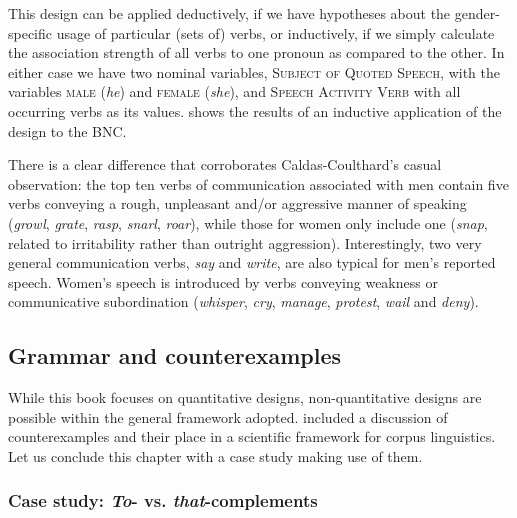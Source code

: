 This design  can be applied deductively,  if we have hypotheses about the gender\hyp{}specific  usage of particular (sets of) verbs,  or inductively,  if we simply calculate the association  strength of all verbs to one pronoun  as compared to the other. In either case we have two nominal  variables, \textsc{Subject of Quoted Speech}, with the variables \textsc{male} (\textit{he}) and \textsc{female} (\textit{she}), and \textsc{Speech Activity Verb} with all occurring verbs  as its values.  shows the results of an inductive  application of the design  to the  BNC.

\hspace*{-0.36885pt}There is a clear difference that corroborates Caldas\hyp{}Coulthard's casual observa\-tion: the top ten verbs  of communication associated  with men contain five verbs conveying a rough, unpleasant and\slash or aggressive manner of speaking (\textit{growl}, \textit{grate}, \textit{rasp}, \textit{snarl}, \textit{roar}), while those for women only include one (\textit{snap}, related to irritability rather than outright aggression).  Interestingly, two very general communication verbs, \textit{say} and \textit{write}, are also typical for men's reported speech. Women's speech is introduced by verbs  conveying weakness or communicative subordination (\textit{whisper}, \textit{cry}, \textit{manage}, \textit{protest}, \textit{wail} and \textit{deny}).

\subsection{Grammar and counterexamples}
\label{sec:grammarandcounterexamples}

While this book focuses on quantitative  designs,  non\hyp{}quantitative  designs are possible within the general framework adopted.  included a discussion of counterexamples  and their place in a scientific framework for corpus linguistics. Let us conclude this chapter with a case study making use of them.

\subsubsection{Case study: \textit{To}- vs. \textit{that}-complements}
\label{sec:tovsthatcomplements}

